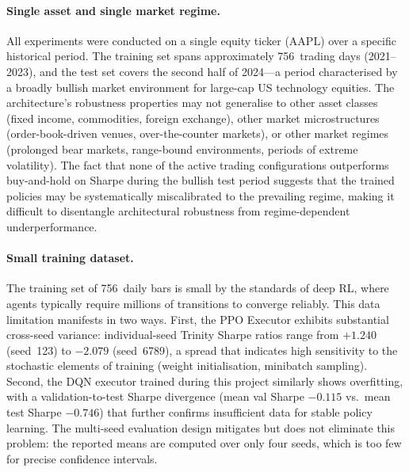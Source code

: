 \paragraph{Single asset and single market regime.}
All experiments were conducted on a single equity ticker (AAPL) over a
specific historical period. The training set spans approximately 756~trading
days (2021--2023), and the test set covers the second half of 2024---a period
characterised by a broadly bullish market environment for large-cap US
technology equities. The architecture's robustness properties may not
generalise to other asset classes (fixed income, commodities, foreign
exchange), other market microstructures (order-book-driven venues, over-the-counter
markets), or other market regimes (prolonged bear markets, range-bound
environments, periods of extreme volatility). The fact that none of the active
trading configurations outperforms buy-and-hold on Sharpe during the bullish
test period suggests that the trained policies may be systematically
miscalibrated to the prevailing regime, making it difficult to disentangle
architectural robustness from regime-dependent underperformance.

\paragraph{Small training dataset.}
The training set of 756~daily bars is small by the standards of deep RL, where
agents typically require millions of transitions to converge reliably. This
data limitation manifests in two ways. First, the PPO Executor exhibits
substantial cross-seed variance: individual-seed Trinity Sharpe ratios range
from $+1.240$ (seed~123) to $-2.079$ (seed~6789), a spread that indicates
high sensitivity to the stochastic elements of training (weight initialisation,
minibatch sampling). Second, the DQN executor trained during this project
similarly shows overfitting, with a validation-to-test Sharpe divergence
(mean val Sharpe $-0.115$ vs.\ mean test Sharpe $-0.746$) that further
confirms insufficient data for stable policy learning. The multi-seed
evaluation design mitigates but does not eliminate this problem: the reported
means are computed over only four seeds, which is too few for precise
confidence intervals.

